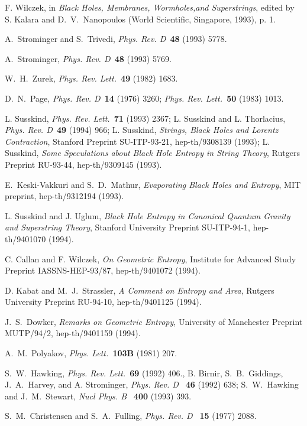  F. Wilczek, in {\it Black Holes, Membranes, Wormholes,and
Superstrings}, edited by S. Kalara and D.~V.~Nanopoulos (World Scientific,
Singapore, 1993), p. 1.

 A.~Strominger and S.~Trivedi, {\sl Phys. Rev. D\ }{\bf 48}
(1993) 5778.

 A.~Strominger, {\sl Phys. Rev. D\ }{\bf 48}
(1993) 5769.

 W.~H.~Zurek, {\sl Phys. Rev. Lett.\ }{\bf 49} (1982) 1683.

 D.~N.~Page, {\sl Phys. Rev. D\ }{\bf 14} (1976) 3260; {\sl Phys.
Rev. Lett.\ }{\bf 50} (1983) 1013.

 L. Susskind, {\sl Phys. Rev. Lett.\ }{\bf 71} (1993) 2367; L.
Susskind and L. Thorlacius, {\sl Phys. Rev. D\ }{\bf 49} (1994) 966; L.
Susskind, {\it Strings, Black Holes and Lorentz Contraction}, Stanford Preprint
SU-ITP-93-21, hep-th/9308139 (1993); L. Susskind, {\it Some Speculations about
Black Hole Entropy in String Theory}, Rutgers Preprint RU-93-44, hep-th/9309145
(1993).

 E.~Keski-Vakkuri and S.~D.~Mathur, {\it Evaporating Black Holes
and Entropy}, MIT preprint, hep-th/9312194 (1993).

 L. Susskind and J. Uglum, {\it Black Hole Entropy in Canonical
Quantum Gravity and Superstring Theory}, Stanford University Preprint
SU-ITP-94-1, hep-th/9401070 (1994).

 C. Callan and F. Wilczek, {\it On Geometric Entropy}, Institute
for Advanced Study Preprint IASSNS-HEP-93/87, hep-th/9401072 (1994).

 D. Kabat and M.~J.~Strassler, {\it A Comment on Entropy and
Area}, Rutgers University Preprint RU-94-10, hep-th/9401125 (1994).

 J.~S.~Dowker, {\it Remarks on Geometric Entropy}, University of
Manchester Preprint MUTP/94/2, hep-th/9401159 (1994).

 A.~M.~Polyakov, {\sl Phys. Lett.\ }{\bf 103B} (1981) 207.

 S.~W.~Hawking, {\sl Phys. Rev. Lett.\ }{\bf 69} (1992) 406.,
B. Birnir, S.~B.~Giddings, J.~A.~Harvey, and A. Strominger,
{\sl Phys. Rev. D\ }
{\bf 46} (1992) 638; S.~W.~Hawking and J.~M.~Stewart, {\sl Nucl Phys. B\ }{\bf
400} (1993) 393.

 S.~M.~Christensen and S.~A.~Fulling, {\sl Phys. Rev. D\ }{\bf
15} (1977) 2088.

